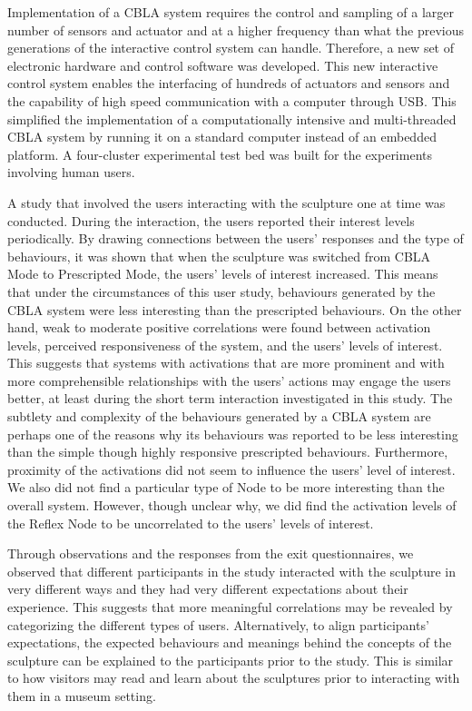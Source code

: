 Implementation of a CBLA system requires the control and sampling of a larger number of sensors and actuator and at a higher frequency than what the previous generations of the interactive control system can handle. Therefore, a new set of electronic hardware and control software was developed. This new interactive control system enables the interfacing of hundreds of actuators and sensors and the capability of high speed communication with a computer through USB. This simplified the implementation of a computationally intensive and multi-threaded CBLA system by running it on a standard computer instead of an embedded platform. A four-cluster experimental test bed was built for the experiments involving human users.

A study that involved the users interacting with the sculpture one at time was conducted. During the interaction, the users reported their interest levels periodically. By drawing connections between the users' responses and the type of behaviours, it was shown that when the sculpture was switched from CBLA Mode to Prescripted Mode, the users' levels of interest increased. This means that under the circumstances of this user study, behaviours generated by the CBLA system were less interesting than the prescripted behaviours. On the other hand, weak to moderate positive correlations were found between activation levels, perceived responsiveness of the system, and the users' levels of interest. This suggests that systems with activations that are more prominent and with more comprehensible relationships with the users' actions may engage the users better, at least during the short term interaction investigated in this study. The subtlety and complexity of the behaviours generated by a CBLA system are perhaps one of the reasons why its behaviours was reported to be less interesting than the simple though highly responsive prescripted behaviours. Furthermore, proximity of the activations did not seem to influence the users' level of interest. We also did not find a particular type of Node to be more interesting than the overall system. However, though unclear why, we did find the activation levels of the Reflex Node to be uncorrelated to the users' levels of interest. 

Through observations and the responses from the exit questionnaires, we observed that different participants in the study interacted with the sculpture in very different ways and they had very different expectations about their experience. This suggests that more meaningful correlations may be revealed by categorizing the different types of users. Alternatively, to align participants' expectations, the expected behaviours and meanings behind the concepts of the sculpture can be explained to the participants prior to the study. This is similar to how visitors may read and learn about the sculptures prior to interacting with them in a museum setting. 
 
